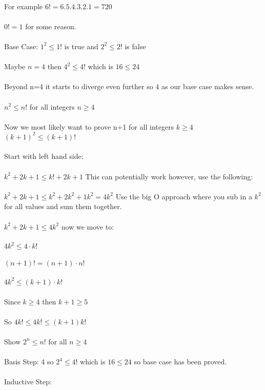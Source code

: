 \documentclass{article}
\begin{document}
\begin{flushleft}
~\\
For example $6! = 6.5.4.3.2.1 = 720$ \\
~\\
$0! = 1$ for some reason.\\
~\\
Base Case: $1^2 \leq 1!$ is true and $2^2 \leq 2!$ is false \\
~\\
Maybe $n=4$ then $4^2 \leq 4!$ which is $16 \leq 24$ \\
~\\
Beyond n=4 it starts to diverge even further so 4 as our base case makes sense. \\
~\\
$n^2 \leq n!$ for all integers $n \geq 4$\\
~\\
Now we most likely want to prove n+1 for all integers $k \geq 4$ \\
$(k+1)^2  \leq (k+1)!$ \\
~\\
Start with left hand side:\\
~\\
$k^2 + 2k + 1 \leq k! + 2k + 1$ This can potentially work however, use the following: \\
~\\
$k^2 + 2k + 1 \leq k^2 + 2k^2 + 1k^2 = 4k^2$ Use the big O approach where you sub in a $k^2$ for all values and sum them together. \\
~\\
$k^2 + 2k + 1 \leq 4k^2$ now we move to: \\
~\\
$4k^2 \leq 4 \cdot k!$ \\
~\\
$(n+1)! = (n+1) \cdot n!$ \\
~\\
$4k^2 \leq (k+1) \cdot k!$ \\
~\\
Since $k \geq 4$ then $k+1 \geq 5$ \\
~\\
So $4k! \leq 4k! \leq (k+1) k!$ \\ 
~\\
Show $2^n \leq n!$ for all $n \geq 4$ \\
~\\
Basis Step: 4 so $2^4 \leq 4!$ which is $16 \leq 24$ so base case has been proved. \\ 
~\\
Inductive Step: 

\end{flushleft}
\end{document}
